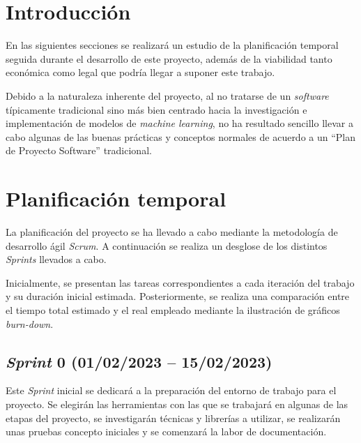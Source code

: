  \label{section:project_plan}

\section{Introducción}

En las siguientes secciones se realizará un estudio de la planificación temporal seguida durante el desarrollo de este proyecto, además de la viabilidad tanto económica como legal que podría llegar a suponer este trabajo.

Debido a la naturaleza inherente del proyecto, al no tratarse de un \textit{software} típicamente tradicional sino más bien centrado hacia la investigación e implementación de modelos de \textit{machine learning}, no ha resultado sencillo llevar a cabo algunas de las buenas prácticas y conceptos normales de acuerdo a un ``Plan de Proyecto Software'' tradicional.

\section{Planificación temporal} \label{section:planification}

La planificación del proyecto se ha llevado a cabo mediante la metodología de desarrollo ágil \textit{Scrum}. A continuación se realiza un desglose de los distintos \textit{Sprints} llevados a cabo.

Inicialmente, se presentan las tareas correspondientes a cada iteración del trabajo y su duración inicial estimada. Posteriormente, se realiza una comparación entre el tiempo total estimado y el real empleado mediante la ilustración de gráficos \textit{burn-down}.

\subsection{\textit{Sprint} 0 (01/02/2023 -- 15/02/2023)}

Este \textit{Sprint} inicial se dedicará a la preparación del entorno de trabajo para el proyecto. Se elegirán las herramientas con las que se trabajará en algunas de las etapas del proyecto, se investigarán técnicas y librerías a utilizar, se realizarán unas pruebas concepto iniciales y se comenzará la labor de documentación.

